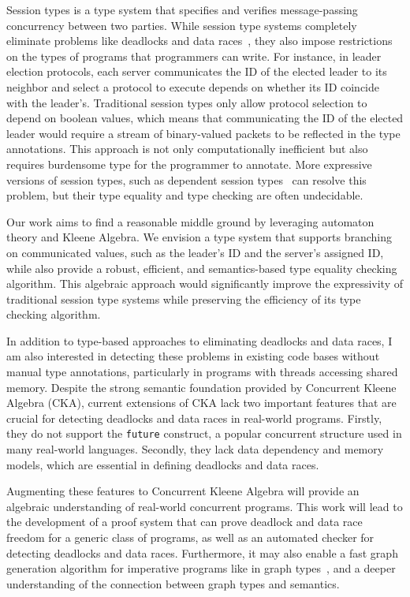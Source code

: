 \documentclass[11pt,a4paper,sans]{moderncv} %
\begin{document}
Session types is a type system that specifies and verifies message-passing concurrency between two parties. 
While session type systems completely eliminate problems like deadlocks and data races~\cite{caires_SessionTypesIntuitionistic_2010,wadler_PropositionsSessions_2012}, they also impose restrictions on the types of programs that programmers can write.
For instance, in leader election protocols, each server communicates the ID of the elected leader to its neighbor and select a protocol to execute depends on whether its ID coincide with the leader's. 
Traditional session types only allow protocol selection to depend on boolean values, which means that communicating the ID of the elected leader would require a stream of binary-valued packets to be reflected in the type annotations. 
This approach is not only computationally inefficient but also requires burdensome type for the programmer to annotate. 
More expressive versions of session types, such as dependent session types~\cite{toninho_DependentSessionTypes_2011,toninho_DecadeDependentSession_2021} can resolve this problem, but their type equality and type checking are often undecidable.

Our work aims to find a reasonable middle ground by leveraging automaton theory and Kleene Algebra. 
We envision a type system that supports branching on communicated values, such as the leader's ID and the server's assigned ID, while also provide a robust, efficient, and semantics-based type equality checking algorithm. 
This algebraic approach would significantly improve the expressivity of traditional session type systems while preserving the efficiency of its type checking algorithm.


In addition to type-based approaches to eliminating deadlocks and data races, I am also interested in detecting these problems in existing code bases without manual type annotations, particularly in programs with threads accessing shared memory.
Despite the strong semantic foundation provided by Concurrent Kleene Algebra (CKA), current extensions of CKA lack two important features that are crucial for detecting deadlocks and data races in real-world programs. 
Firstly, they do not support the \texttt{future} construct, a popular concurrent structure used in many real-world languages. 
Secondly, they lack data dependency and memory models, which are essential in defining deadlocks and data races.

Augmenting these features to Concurrent Kleene Algebra will provide an algebraic understanding of real-world concurrent programs. 
This work will lead to the development of a proof system that can prove deadlock and data race freedom for a generic class of programs, as well as an automated checker for detecting deadlocks and data races. 
Furthermore, it may also enable a fast graph generation algorithm for imperative programs like in graph types~\cite{muller_LanguageAgnosticStaticDeadlock_2024a}, and a deeper understanding of the connection between graph types and semantics.
\end{document}
